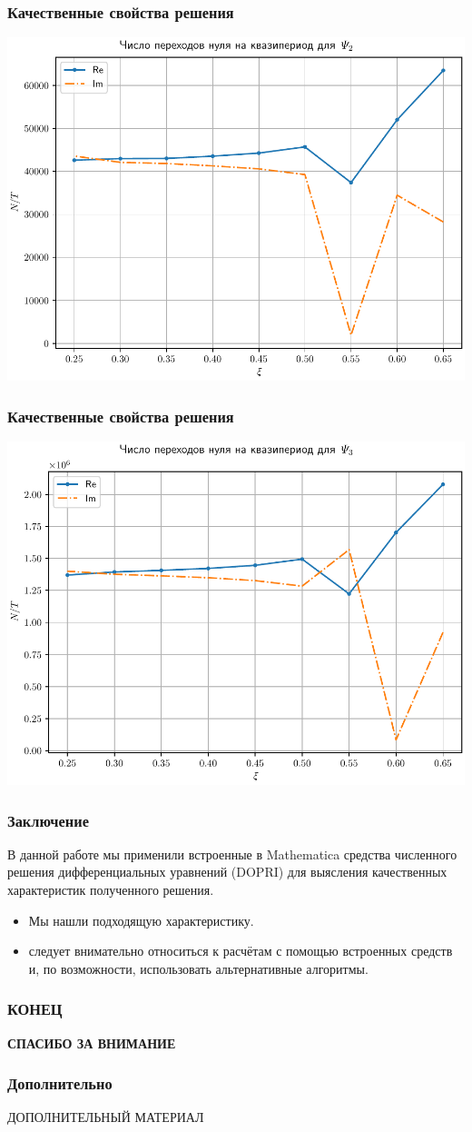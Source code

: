 \documentclass[utf8,9pt,mathserif,usepdftitle=false]{beamer}
\begin{document}
\begin{frame}
	\frametitle{Качественные свойства решения}%
	\includegraphics[width=\linewidth]{psi2-rel-trans-ru}
\end{frame}

\begin{frame}
	\frametitle{Качественные свойства решения}%
	\includegraphics[width=\linewidth]{psi3-rel-trans-ru}
\end{frame}

\begin{frame}
  \frametitle{Заключение}%
  В данной работе мы применили встроенные в Mathematica средства численного
  решения дифференциальных уравнений (DOPRI) для выясления качественных
  характеристик полученного решения. 
  \begin{itemize}
  \item<1-> Мы нашли подходящую характеристику.
  \item<2->следует внимательно относиться к расчётам с помощью встроенных средств и, по возможности, использовать альтернативные алгоритмы.
  \end{itemize}
\end{frame}

\begin{frame}
  \frametitle{КОНЕЦ}%
  \LARGE%
  \centering%
  \bfseries%
  СПАСИБО ЗА ВНИМАНИЕ%
\end{frame}

\begin{frame}
  \frametitle{Дополнительно}%
  \centering%
  ДОПОЛНИТЕЛЬНЫЙ МАТЕРИАЛ
\end{frame}
\end{document}
